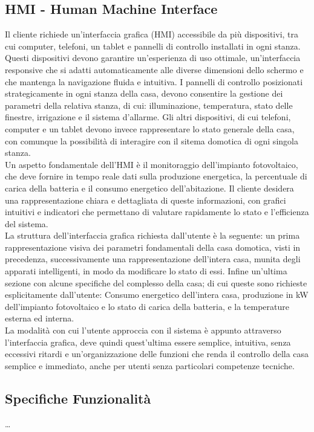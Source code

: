 \documentclass[italian, 12pt, a4paper]{article}
\begin{document}
\subsection{HMI - Human Machine Interface}
Il cliente richiede un’interfaccia grafica (HMI) accessibile da più dispositivi, tra cui computer, telefoni, un tablet e pannelli di controllo installati in ogni stanza. Questi dispositivi devono garantire un'esperienza di uso ottimale, un'interfaccia responsive che si adatti automaticamente alle diverse dimensioni dello schermo e che mantenga la navigazione fluida e intuitiva.  I pannelli di controllo posizionati strategicamente in ogni stanza della casa, devono consentire la gestione dei parametri della relativa stanza, di cui: illuminazione, temperatura, stato delle finestre, irrigazione e il sistema d’allarme. Gli altri dispositivi, di cui telefoni, computer e un tablet devono invece rappresentare lo stato generale della casa, con comunque la possibilità di interagire con il sitema domotica di ogni singola stanza.\\[1.5mm]
Un aspetto fondamentale dell’HMI è il monitoraggio dell’impianto fotovoltaico, che deve fornire in tempo reale dati sulla produzione energetica, la percentuale di carica della batteria e il consumo energetico dell’abitazione. Il cliente desidera una rappresentazione chiara e dettagliata di queste informazioni, con grafici intuitivi e indicatori che permettano di valutare rapidamente lo stato e l’efficienza del sistema.\\[1.5mm]
La struttura dell’interfaccia grafica richiesta dall’utente è la seguente: un prima rappresentazione visiva dei parametri fondamentali della casa domotica, visti in precedenza, successivamente una rappresentazione dell’intera casa, munita degli apparati intelligenti, in modo da modificare lo stato di essi. Infine un’ultima sezione con alcune specifiche del complesso della casa; di cui queste sono richieste esplicitamente dall’utente: Consumo energetico dell’intera casa, produzione in kW dell’impianto fotovoltaico e lo stato di carica della batteria, e la temperature esterna ed interna.\\[1.5mm]
La modalità con cui l’utente approccia con il sistema è appunto attraverso l’interfaccia grafica, deve quindi quest’ultima essere semplice, intuitiva, senza eccessivi ritardi e un’organizzazione delle funzioni che renda il controllo della casa semplice e immediato, anche per utenti senza particolari competenze tecniche.
\subsection{Specifiche Funzionalità}
\ldots
\clearpage
\end{document}
